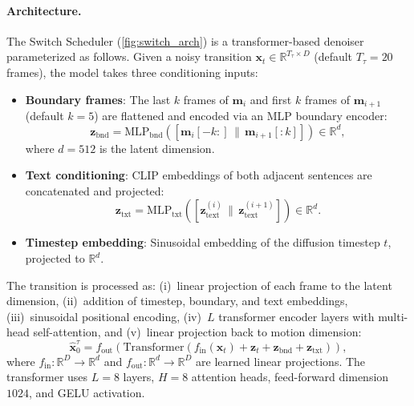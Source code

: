 \documentclass[runningheads]{llncs}
\newcommand{\bx}{\mathbf{x}}
\newcommand{\bz}{\mathbf{z}}
\newcommand{\bm}{\mathbf{m}}
\begin{document}
\paragraph{Architecture.}
The Switch Scheduler (\cref{fig:switch_arch}) is a transformer-based denoiser parameterized as follows.
Given a noisy transition $\bx_t \in \mathbb{R}^{T_\tau \times D}$ (default $T_\tau = 20$ frames), the model takes three conditioning inputs:
\begin{itemize}
    \item \textbf{Boundary frames}: The last $k$ frames of $\bm_i$ and first $k$ frames of $\bm_{i{+}1}$ (default $k{=}5$) are flattened and encoded via an MLP boundary encoder:
    \begin{equation}
        \bz_\text{bnd} = \text{MLP}_\text{bnd}\left([\bm_i[-k{:}] \,\|\, \bm_{i{+}1}[{:}k]]\right) \in \mathbb{R}^{d},
        \label{eq:boundary_enc}
    \end{equation}
    where $d = 512$ is the latent dimension.
    \item \textbf{Text conditioning}: CLIP embeddings of both adjacent sentences are concatenated and projected:
    \begin{equation}
        \bz_\text{txt} = \text{MLP}_\text{txt}\left([\bz_\text{text}^{(i)} \,\|\, \bz_\text{text}^{(i{+}1)}]\right) \in \mathbb{R}^{d}.
        \label{eq:text_enc}
    \end{equation}
    \item \textbf{Timestep embedding}: Sinusoidal embedding of the diffusion timestep $t$, projected to $\mathbb{R}^d$.
\end{itemize}

The transition is processed as: (i)~linear projection of each frame to the latent dimension, (ii)~addition of timestep, boundary, and text embeddings, (iii)~sinusoidal positional encoding, (iv)~$L$ transformer encoder layers with multi-head self-attention, and (v)~linear projection back to motion dimension:
\begin{equation}
    \hat{\bx}_0^\tau = f_\text{out}\left(\text{Transformer}\left(f_\text{in}(\bx_t) + \bz_t + \bz_\text{bnd} + \bz_\text{txt}\right)\right),
    \label{eq:switch_forward}
\end{equation}
where $f_\text{in}: \mathbb{R}^D \to \mathbb{R}^d$ and $f_\text{out}: \mathbb{R}^d \to \mathbb{R}^D$ are learned linear projections.
The transformer uses $L{=}8$ layers, $H{=}8$ attention heads, feed-forward dimension $1024$, and GELU activation.
\end{document}
